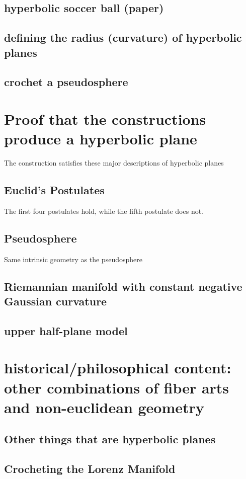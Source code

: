 \documentclass[letterpaper,titlepage]{article}
\begin{document}
\subsection{hyperbolic soccer ball (paper)}
\subsection{defining the radius (curvature) of hyperbolic planes}
\subsection{crochet a pseudosphere}

\section{Proof that the constructions produce a hyperbolic plane}
The construction satisfies these major descriptions of hyperbolic planes
\subsection{Euclid's Postulates}
The first four postulates hold, while the fifth postulate does not.
\subsection{Pseudosphere}
Same intrinsic geometry as the pseudosphere
\subsection{Riemannian manifold with constant negative Gaussian curvature}
\subsection{upper half-plane model}

\section{historical/philosophical content: other combinations of fiber arts and non-euclidean geometry}
\subsection{Other things that are hyperbolic planes\cite{adventures}}
\subsection{Crocheting the Lorenz Manifold \cite{crochetlorenz}}
\end{document}
